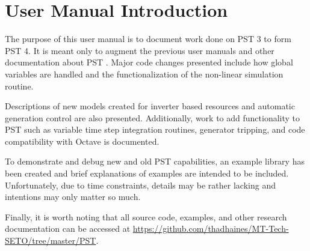 \vspace{2em} %
\chapter*{User Manual Introduction}

The purpose of this user manual is to document work done on PST 3 to form PST 4. 
It is meant only to augment the previous user manuals and other documentation about \mbox{PST} \cite{chow1992, PST2LFTut, PST3manual, chow2015}.
%
Major code changes presented include 
how global variables are handled
and the
functionalization of the non-linear simulation routine.

\vspace{1em}
Descriptions of new models created for
inverter based resources
and
automatic generation control
are also presented.
Additionally, work to add functionality to PST such as
variable time step integration routines,
generator tripping, %
and
code compatibility with Octave
is documented.



\vspace{1em}
To demonstrate and debug new and old PST capabilities, an example library has been created and brief explanations of examples are intended to be included.
Unfortunately, due to time constraints, details may be rather lacking and intentions may only matter so much.

\vspace{1em}
Finally, it is worth noting that all source code, examples, and other research documentation can be accessed at 
\href{https://github.com/thadhaines/MT-Tech-SETO/tree/master/PST}{https://github.com/thadhaines/MT-Tech-SETO/tree/master/PST}.